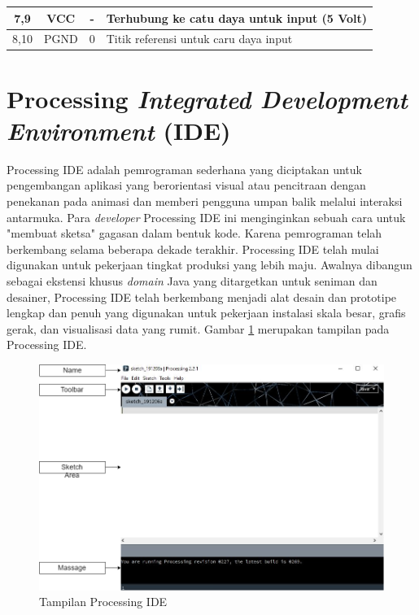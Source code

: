\begin{table}[H]
{\begin{tabular}{|c|c|c|l|}
		7,9  & VCC  & -   & Terhubung ke catu daya untuk input (5 Volt)                                                                                                                                 \\ \hline
		8,10 & PGND & 0   & Titik referensi untuk caru daya input                                                                                                                                       \\ \hline
	\end{tabular}}
\end{table}

\section{Processing \textit{Integrated Development Environment} (IDE)}
Processing IDE adalah pemrograman sederhana yang diciptakan untuk pengembangan aplikasi yang berorientasi visual atau pencitraan dengan penekanan pada animasi dan memberi pengguna umpan balik melalui interaksi antarmuka. Para \textit{developer} Processing IDE ini menginginkan sebuah cara untuk "membuat sketsa" gagasan dalam bentuk kode. Karena pemrograman telah berkembang selama beberapa dekade terakhir. Processing IDE telah mulai digunakan untuk pekerjaan tingkat produksi yang lebih maju. Awalnya dibangun sebagai ekstensi khusus \textit{domain} Java yang ditargetkan untuk seniman dan desainer, Processing IDE telah berkembang menjadi alat desain dan prototipe lengkap dan penuh yang digunakan untuk pekerjaan instalasi skala besar, grafis gerak, dan visualisasi data yang rumit. Gambar \ref{pic.processingide} merupakan tampilan pada Processing IDE.
	\begin{figure}[H]
	\centering
	\includegraphics[width=12cm]{gambar/processing_view.png}
	\caption{Tampilan Processing IDE}
	\label{pic.processingide}
	\end{figure}


